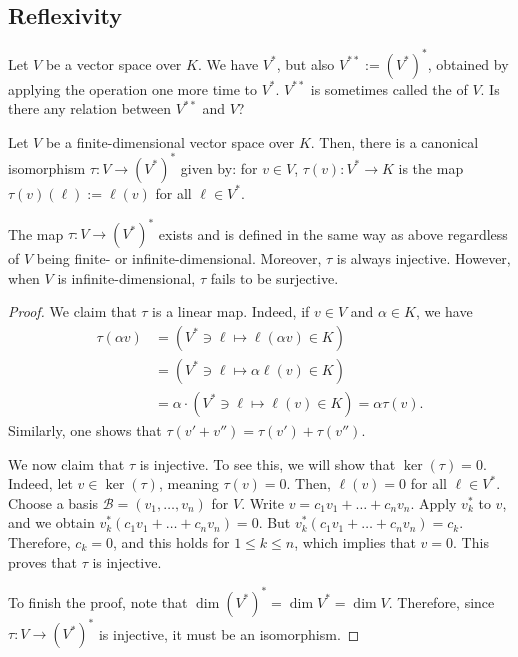 \subsection{Reflexivity}
Let $V$ be a vector space over $K$. We have $V^*$, but also $V^{**} := (V^*)^*$, obtained by applying the  operation one more time to $V^*$. $V^{**}$ is sometimes called the  of $V$. Is there any relation between $V^{**}$ and $V$?

\begin{theorem}
\label{thm:natural_map_injective}
  Let $V$ be a finite-di\-men\-sional vector space over $K$. Then, there is a canonical isomorphism $\tau \colon V \to (V^*)^*$ given by: for $v \in V$, $\tau(v) \colon V^* \to K$ is the map $\tau(v)(\ell) := \ell(v)$ for all $\ell \in V^*$.
\end{theorem}

\begin{remark}
  The map $\tau \colon V \to (V^*)^*$ exists and is defined in the same way as above regardless of $V$ being finite- or infinite-dimensional. Moreover, $\tau$ is always injective. However, when $V$ is infinite-dimensional, $\tau$ fails to be surjective.
\end{remark}

\begin{proof}
  We claim that $\tau$ is a linear map. Indeed, if $v \in V$ and $\alpha \in K$, we have
  \begin{align*}
    \tau(\alpha v) &= (V^* \ni \ell \mapsto \ell(\alpha v) \in K) \\
    &= (V^* \ni \ell \mapsto \alpha \ell(v) \in K) \\
    &= \alpha \cdot (V^* \ni \ell \mapsto \ell(v) \in K) = \alpha \tau(v).
  \end{align*}
  Similarly, one shows that $\tau(v' + v'') = \tau(v') + \tau(v'')$.

  We now claim that $\tau$ is injective. To see this, we will show that $\ker(\tau) = 0$. Indeed, let $v \in \ker(\tau)$, meaning $\tau(v) = 0$. Then, $\ell(v) = 0$ for all $\ell \in V^*$. Choose a basis $\mathcal{B} = (v_1, \dots, v_n)$ for $V$. Write $v = c_1 v_1 + \dots + c_n v_n$. Apply $v_k^*$ to $v$, and we obtain $v_k^*(c_1 v_1 + \dots + c_n v_n) = 0$. But $v_k^*(c_1 v_1 + \dots + c_n v_n) = c_k$. Therefore, $c_k = 0$, and this holds for $1 \leq k \leq n$, which implies that $v = 0$. This proves that $\tau$ is injective.

  To finish the proof, note that $\dim(V^*)^* = \dim V^* = \dim V$. Therefore, since $\tau \colon V \to (V^*)^*$ is injective, it must be an isomorphism.
\end{proof}

